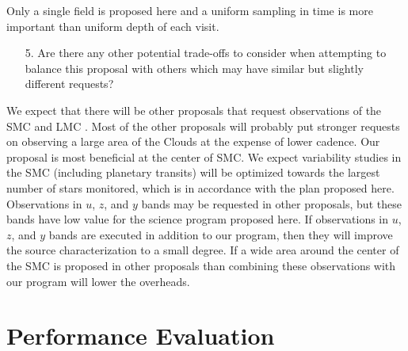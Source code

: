 \documentclass[12pt,letterpaper]{article}
\begin{document}
Only a single field is proposed here and a uniform sampling in time is more 
important than uniform depth of each visit.

\begin{footnotesize}
\begin{enumerate}
    \item[5.] Are there any other potential trade-offs to consider when attempting to balance this proposal with others which may have similar but slightly different requests?
\end{enumerate}
\end{footnotesize}

We expect that there will be other proposals that request observations of the SMC and LMC 
\citep[see Sec.~7 in][]{marshall17}.  Most of the other proposals will probably 
put stronger requests on observing a large area of the Clouds at the expense of lower cadence.  
Our proposal is most beneficial at the center of SMC.  We expect variability 
studies in the SMC (including planetary transits) will be optimized towards 
the largest number of stars monitored, which is in accordance with the plan 
proposed here. Observations in $u$, $z$, and $y$ bands may be requested 
in other proposals, but these bands have low value for the science program 
proposed here.  If observations in $u$, $z$, and $y$ bands 
are executed in addition to our program, then they 
will improve the source characterization to a small degree.  
If a wide area around the center of the SMC is proposed in other proposals 
than combining these observations with our program will lower the overheads. 



\section{Performance Evaluation}
\end{document}
